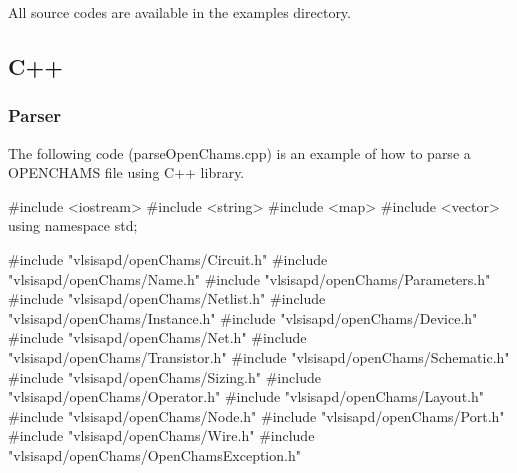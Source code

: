 All source codes are available in the {\ttfamily examples} directory.\hypertarget{openchams_openChamsC}{}\subsection{C++}\label{openchams_openChamsC}
\hypertarget{openchams_openChamsParseC}{}\subsubsection{Parser}\label{openchams_openChamsParseC}
The following code ({\ttfamily parse\-Open\-Chams.\-cpp}) is an example of how to parse a O\-P\-E\-N\-C\-H\-A\-M\-S file using C++ library. 
\begin{DoxyCodeInclude}
\textcolor{preprocessor}{#include <iostream>}
\textcolor{preprocessor}{#include <string>}
\textcolor{preprocessor}{#include <map>}
\textcolor{preprocessor}{#include <vector>}
\textcolor{keyword}{using namespace }std;

\textcolor{preprocessor}{#include "vlsisapd/openChams/Circuit.h"}
\textcolor{preprocessor}{#include "vlsisapd/openChams/Name.h"}
\textcolor{preprocessor}{#include "vlsisapd/openChams/Parameters.h"}
\textcolor{preprocessor}{#include "vlsisapd/openChams/Netlist.h"}
\textcolor{preprocessor}{#include "vlsisapd/openChams/Instance.h"}
\textcolor{preprocessor}{#include "vlsisapd/openChams/Device.h"}
\textcolor{preprocessor}{#include "vlsisapd/openChams/Net.h"}
\textcolor{preprocessor}{#include "vlsisapd/openChams/Transistor.h"}
\textcolor{preprocessor}{#include "vlsisapd/openChams/Schematic.h"}
\textcolor{preprocessor}{#include "vlsisapd/openChams/Sizing.h"}
\textcolor{preprocessor}{#include "vlsisapd/openChams/Operator.h"}
\textcolor{preprocessor}{#include "vlsisapd/openChams/Layout.h"}
\textcolor{preprocessor}{#include "vlsisapd/openChams/Node.h"}
\textcolor{preprocessor}{#include "vlsisapd/openChams/Port.h"}
\textcolor{preprocessor}{#include "vlsisapd/openChams/Wire.h"}
\textcolor{preprocessor}{#include "vlsisapd/openChams/OpenChamsException.h"}


\end{DoxyCodeInclude}
